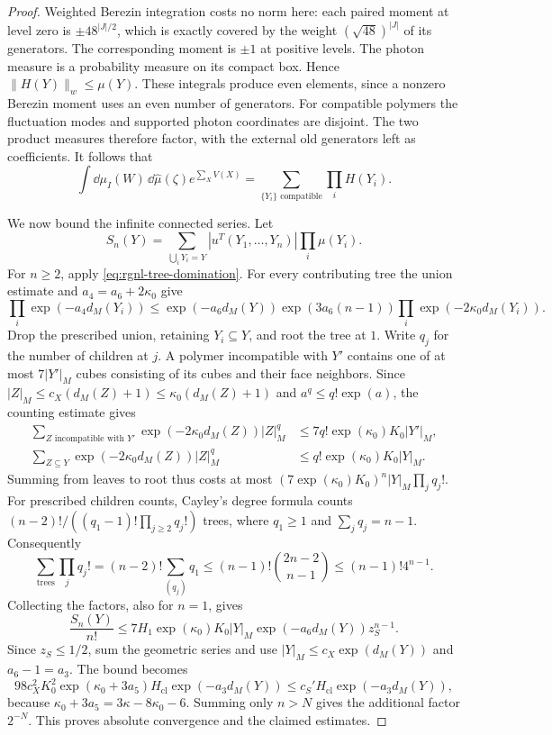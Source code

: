 \begin{proof}
Weighted Berezin integration costs no norm here:
each paired moment at level zero is
$\pm48^{|J|/2}$, which is exactly covered by the
weight $(\sqrt{48})^{|J|}$ of its generators.
The corresponding moment is $\pm1$ at positive levels.
The photon measure is a probability measure on its compact
box. Hence $\|H(Y)\|_w\le\mu(Y)$.
These integrals produce even elements, since a nonzero
Berezin moment uses an even number of generators.
For compatible polymers the fluctuation modes and
supported photon coordinates are disjoint. The two
product measures therefore factor, with the external
old generators left as coefficients. It follows that
\begin{equation}\label{eq:rgnl-compatible-partition}
 \int\dd\mu_I(W)\,\dd\widehat\mu(\zeta)e^{\sum_XV(X)}
             =\sum_{\{Y_i\}\text{ compatible}}\prod_iH(Y_i).
\end{equation}

We now bound the infinite connected series. Let
\[
 S_n(Y)=\sum_{\bigcup_iY_i=Y}
                   |u^T(Y_1,\ldots,Y_n)|\prod_i\mu(Y_i).
\]
For $n\ge2$, apply \eqref{eq:rgnl-tree-domination}.
For every contributing tree the union estimate and
$a_4=a_6+2\kappa_0$ give
\[
 \prod_i \exp(-a_4d_M(Y_i))
 \le \exp(-a_6d_M(Y))\exp(3a_6(n-1))
                                  \prod_i \exp(-2\kappa_0d_M(Y_i)).
\]
Drop the prescribed union, retaining $Y_i\subseteq Y$,
and root the tree at $1$. Write $q_j$ for the number
of children at $j$. A polymer incompatible with $Y'$
contains one of at most $7|Y'|_M$ cubes consisting of
its cubes and their face neighbors. Since
$|Z|_M\le c_X(d_M(Z)+1)\le\kappa_0(d_M(Z)+1)$ and
$a^q\le q!\exp(a)$, the counting estimate gives
\begin{align*}
 \sum_{Z\text{ incompatible with }Y'}
      \exp(-2\kappa_0d_M(Z))|Z|_M^{q}
            &\le7q!\exp(\kappa_0)K_0|Y'|_M,\\
 \sum_{Z\subseteq Y}\exp(-2\kappa_0d_M(Z))|Z|_M^q
            &\le q!\exp(\kappa_0)K_0|Y|_M.
\end{align*}
Summing from leaves to root thus costs at most
$(7\exp(\kappa_0)K_0)^n|Y|_M\prod_jq_j!$.
For prescribed children counts, Cayley's degree formula
\cite[Proposition~4]{PostnikovLin2019}
counts
$(n-2)!/((q_1-1)!\prod_{j\ge2}q_j!)$ trees, where
$q_1\ge1$ and $\sum_jq_j=n-1$.
Consequently
\[
 \sum_{\text{trees}}\prod_jq_j!
   =(n-2)!\sum_{(q_j)}q_1
   \le(n-1)!\binom{2n-2}{n-1}
   \le(n-1)!4^{n-1}.
\]
Collecting the factors, also for $n=1$, gives
\begin{equation}\label{eq:rgnl-connected-n-bound}
 \frac{S_n(Y)}{n!}
 \le7H_1\exp(\kappa_0)K_0|Y|_M
                                      \exp(-a_6d_M(Y))z_S^{n-1}.
\end{equation}
Since $z_S\le1/2$, sum the geometric series and use
$|Y|_M\le c_X\exp(d_M(Y))$ and $a_6-1=a_3$.
The bound becomes
\[
 98c_X^2K_0^2\exp(\kappa_0+3a_5)
                                 H_{\mathrm{cl}}\exp(-a_3d_M(Y))
 \le c_S'H_{\mathrm{cl}}\exp(-a_3d_M(Y)),
\]
because $\kappa_0+3a_5=3\kappa-8\kappa_0-6$.
Summing only $n>N$ gives the additional factor $2^{-N}$.
This proves absolute convergence and the claimed estimates.


\end{proof}
